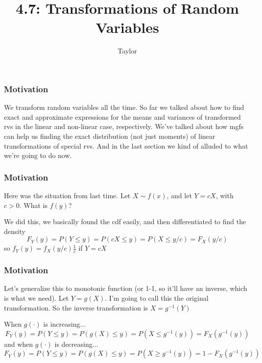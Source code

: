 \documentclass{beamer}
\title["4.7"]{4.7: Transformations of Random Variables}
\author{Taylor}
\institute[UVA] 
{
University of Virginia \\
\medskip
\textit{} 
}
\date{}
\begin{document}

\begin{frame}
\titlepage 
\end{frame}

\begin{frame}
\frametitle{Motivation}

We transform random variables all the time. So far we talked about how to find exact and approximate expressions for the means and variances of transformed rvs in the linear and non-linear case, respectively. We've talked about how mgfs can help us finding the exact distribution (not just moments) of linear transformations of special rvs. And in the last section we kind of alluded to what we're going to do now. 

\end{frame}


\begin{frame}
\frametitle{Motivation}

Here was the situation from last time. Let $X \sim f(x)$, and let $Y = cX$, with $c > 0$. What is $f(y)$? 
\newline

We did this, we basically found the cdf easily, and then differentiated to find the density
\[
F_Y(y) = P(Y \le y) = P(cX \le y) = P(X \le y/c) = F_X(y/c)
\]
so $f_Y(y) = f_X(y/c)\frac{1}{c}$ if $Y = cX$
\end{frame}


\begin{frame}
\frametitle{Motivation}

Let's generalize this to monotonic function (or 1-1, so it'll have an inverse, which is what we need). Let $Y = g(X)$. I'm going to call this the original transformation. So the inverse transformation is $X = g^{-1}(Y)$ 
\newline

When $g(\cdot)$ is increasing...
\[
F_Y(y) = P(Y \le y) = P(g(X) \le y) = P(X \le g^{-1}(y)) = F_X(g^{-1}(y))
\]
and when $g(\cdot)$ is decreasing...
\[
F_Y(y) = P(Y \le y) = P(g(X) \le y) = P(X \ge g^{-1}(y)) = 1 - F_X(g^{-1}(y))
\]

\end{frame}
\end{document}
